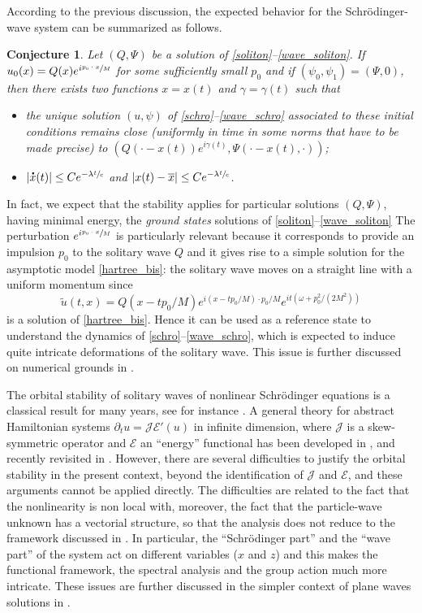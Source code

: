 \documentclass[JEP,XML,SOM,NoEqCountersInSection,NoFloatCountersInSection,Unicode,published]{cedram}
\let\bar\oldbar
\let\tilde\oldtilde
\newtheorem{conj}[lemma]{Conjecture}
\theoremstyle{definition}
\newcommand*{\overbigdot}[1]{%
\accentset{\mbox{\large\bfseries .}}{#1}}
\let\bar\overline
\let\tilde\widetilde
\begin{document}
According to the previous discussion, the expected behavior for the Schrödinger-wave system can be summarized as follows.
\begin{conj}
Let $(Q,\Psi)$ be a solution of \eqref{soliton}--\eqref{wave_soliton}.
If $u_{0}(x)=Q(x)e^{i\sfrac{p_{0}\cdot x}{M}}$ for some sufficiently small $p_{0}$ and if $(\psi_{0},\psi_{1})=(\Psi,0)$, then there exists two functions $x=x(t)$ and $\gamma=\gamma(t)$ such that
\begin{itemize}
\item the unique solution $(u,\psi)$ of \eqref{schro}--\eqref{wave_schro} associated to these initial conditions remains close (uniformly in time in some norms that have to be made precise) to $(Q(\cdot-x(t))e^{i\gamma(t)},\Psi(\cdot-x(t),\cdot))$;
\item $|\overbigdot{x}(t)|\leq C e^{-\lambda\sfrac{t}{c}}$ and $|x(t)-\bar{x}|\leq C e^{-\lambda\sfrac{t}{c}}$.
\end{itemize}
\end{conj}

In fact, we expect that the stability applies for particular solutions $(Q,\Psi)$, having minimal energy, the \emph{ground states} solutions of \eqref{soliton}--\eqref{wave_soliton}
The perturbation $e^{i\sfrac{p_{0}\cdot x}{M}}$ is particularly relevant because
it corresponds to provide an impulsion $p_0$ to the solitary wave
$Q$ and it gives rise
to a simple solution for the asymptotic model \eqref{hartree_bis}:
the solitary wave moves on a straight
line with a uniform momentum
since
\[
\tilde u(t,x)=Q(x-tp_0/M)e^{i(x-tp_0/M)\cdot p_0/M}e^{it(\omega +p_0^2/(2M^2))}
\]
is a solution of \eqref{hartree_bis}.
Hence it can be used as a reference state to understand the dynamics of
\eqref{schro}--\eqref{wave_schro}, which is expected to induce
quite intricate deformations of the solitary wave. This issue is further discussed
on numerical grounds in \cite{LVNum1}.

The orbital stability of solitary waves of nonlinear Schrödinger equations is a classical result for many years, see for instance \cite{Cazenave_Lions_orbital_stab,Weinstein1,Weinstein2}.
A general theory for abstract Hamiltonian systems $\partial_t u=\mathscr J \mathscr E'(u)$
in infinite dimension, where $\mathscr J$ is a skew-symmetric operator and $\mathscr E$ an ``energy'' functional
has been developed in \cite{GSS,GSS2}, and recently revisited in \cite{SRN1}.
However, there are several difficulties to justify the orbital stability in the present context, beyond the identification of $\mathscr J$ and $\mathscr E$, and these arguments cannot be applied directly.
The difficulties are
related to the fact that the nonlinearity is non local with, moreover,
the fact that the particle-wave unknown has a vectorial structure, so that the analysis does not reduce to the framework discussed in \cite{GSS,GSS2}.
In particular,
the ``Schrödinger part'' and the ``wave part'' of the system act on different variables ($x$ and $z$)
and this makes the functional framework, the spectral analysis and the group action much more intricate.
These issues are further discussed in the simpler context of plane waves solutions in \cite{GRN}.
\end{document}
